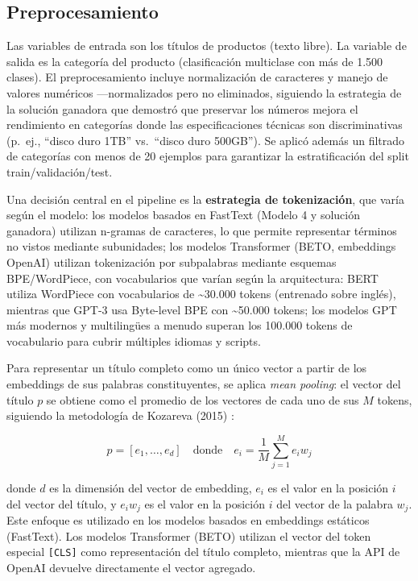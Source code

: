 \documentclass[11pt,a4paper]{article}
\begin{document}
\subsection{Preprocesamiento}

Las variables de entrada son los títulos de productos (texto libre). La variable de salida es la categoría del producto (clasificación multiclase con más de 1.500 clases). El preprocesamiento incluye normalización de caracteres y manejo de valores numéricos ---normalizados pero no eliminados, siguiendo la estrategia de la solución ganadora que demostró que preservar los números mejora el rendimiento en categorías donde las especificaciones técnicas son discriminativas (p.\ ej., ``disco duro 1TB'' vs.\ ``disco duro 500GB''). Se aplicó además un filtrado de categorías con menos de 20 ejemplos para garantizar la estratificación del split train/validación/test.

Una decisión central en el pipeline es la \textbf{estrategia de tokenización}, que varía según el modelo: los modelos basados en FastText (Modelo 4 y solución ganadora) utilizan n-gramas de caracteres, lo que permite representar términos no vistos mediante subunidades; los modelos Transformer (BETO, embeddings OpenAI) utilizan tokenización por subpalabras mediante esquemas BPE/WordPiece, con vocabularios que varían según la arquitectura: BERT utiliza WordPiece con vocabularios de \textasciitilde30.000 tokens (entrenado sobre inglés), mientras que GPT-3 usa Byte-level BPE con \textasciitilde50.000 tokens; los modelos GPT más modernos y multilingües a menudo superan los 100.000 tokens de vocabulario para cubrir múltiples idiomas y scripts.

Para representar un título completo como un único vector a partir de los embeddings de sus palabras constituyentes, se aplica \emph{mean pooling}: el vector del título $p$ se obtiene como el promedio de los vectores de cada uno de sus $M$ tokens, siguiendo la metodología de Kozareva (2015) \cite{kozareva2015}:

\begin{equation}
p = [e_1, \ldots, e_d] \quad \text{donde} \quad e_i = \frac{1}{M} \sum_{j=1}^{M} e_i w_j
\label{eq:meanpooling}
\end{equation}

donde $d$ es la dimensión del vector de embedding, $e_i$ es el valor en la posición $i$ del vector del título, y $e_i w_j$ es el valor en la posición $i$ del vector de la palabra $w_j$. Este enfoque es utilizado en los modelos basados en embeddings estáticos (FastText). Los modelos Transformer (BETO) utilizan el vector del token especial \texttt{[CLS]} como representación del título completo, mientras que la API de OpenAI devuelve directamente el vector agregado.
\end{document}

